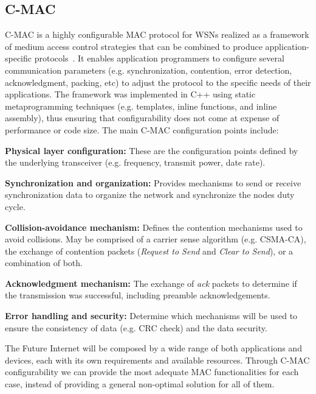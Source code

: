 

\subsection{C-MAC}
C-MAC is a highly configurable MAC protocol for WSNs realized as a framework of
medium access control strategies that can be combined to produce
application-specific protocols~\cite{steiner:2010}. It enables application
programmers to configure several communication parameters (e.g.  synchronization,
contention, error detection, acknowledgment, packing, etc) to adjust the protocol
to the specific needs of their applications. The framework was implemented in C++ 
using static metaprogramming techniques (e.g. templates, inline functions, and 
inline assembly), thus ensuring that configurability does not come at expense of 
performance or code size. The main C-MAC configuration points include:

\textbf{Physical layer configuration:} These are the configuration points defined
by the underlying transceiver (e.g. frequency, transmit power, date rate).

\textbf{Synchronization and organization:} Provides mechanisms to send or receive
synchronization data to organize the network and synchronize the nodes duty
cycle.

\textbf{Collision-avoidance mechanism:} Defines the contention mechanisms used to
avoid collisions. May be comprised of a carrier sense algorithm (e.g. CSMA-CA),
the exchange of contention packets (\emph{Request to Send} and \emph{Clear to
Send}), or a combination of both.

\textbf{Acknowledgment mechanism:} The exchange of \emph{ack} packets to
determine if the transmission was successful, including preamble acknowledgements.

\textbf{Error handling and security:} Determine which mechanisms will be used to
ensure the consistency of data (e.g. CRC check) and the data security.

The Future Internet will be composed by a wide range of both applications and devices, 
each with its own requirements and available resources. Through C-MAC configurability we
can provide the most adequate MAC functionalities for each case, instead of providing a 
general non-optimal solution for all of them.

